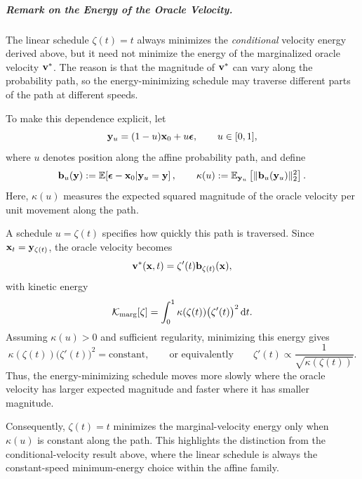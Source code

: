 \subparagraph{Remark on the Energy of the Oracle Velocity.}
The linear schedule $\zeta(t)=t$ always minimizes the \emph{conditional}
velocity energy derived above, but it need not minimize the energy of the
marginalized oracle velocity ${\mathbf{v}}^*$. The reason is that the magnitude of
${\mathbf{v}}^*$ can vary along the probability path, so the energy-minimizing schedule
may traverse different parts of the path at different speeds.

To make this dependence explicit, let
\[
{\mathbf{y}}_u=(1-u){\mathbf{x}}_0+u{\bm{\epsilon}},
\qquad u\in[0,1],
\]
where $u$ denotes position along the affine probability path, and define
\[
\mathbf{b}_u({\mathbf{y}})
:=
\mathbb{E}\!\left[{\bm{\epsilon}}-{\mathbf{x}}_0|{\mathbf{y}}_u={\mathbf{y}}\right],
\qquad
\kappa(u)
:=
\mathbb{E}_{{\mathbf{y}}_u}
\left[
\|\mathbf{b}_u({\mathbf{y}}_u)\|_2^2
\right].
\]
Here, $\kappa(u)$ measures the expected squared magnitude of the oracle
velocity per unit movement along the path.

A schedule $u=\zeta(t)$ specifies how quickly this path is traversed. Since
${\mathbf{x}}_t={\mathbf{y}}_{\zeta(t)}$, the oracle velocity becomes
\[
{\mathbf{v}}^*({\mathbf{x}},t)
=
\zeta'(t)\mathbf{b}_{\zeta(t)}({\mathbf{x}}),
\]
with kinetic energy
\[
\mathcal{K}_{\mathrm{marg}}[\zeta]
=
\int_0^1
\kappa(\zeta(t))
\bigl(\zeta'(t)\bigr)^2
\mathop{}\!\mathrm{d} t.
\]
Assuming $\kappa(u)>0$ and sufficient regularity, minimizing this energy gives
\[
\kappa(\zeta(t))
\bigl(\zeta'(t)\bigr)^2
=
\text{constant},
\qquad\text{or equivalently}\qquad
\zeta'(t)
\propto
\frac{1}{\sqrt{\kappa(\zeta(t))}}.
\]
Thus, the energy-minimizing schedule moves more slowly where the oracle
velocity has larger expected magnitude and faster where it has smaller
magnitude.

Consequently, $\zeta(t)=t$ minimizes the marginal-velocity energy only when
$\kappa(u)$ is constant along the path. This highlights the distinction from
the conditional-velocity result above, where the linear schedule is always the
constant-speed minimum-energy choice within the affine family.







